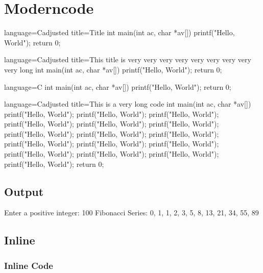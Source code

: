 \documentclass[10pt]{article}
\begin{document}
\section{Moderncode}

\begin{moderncode}{language=C}{adjusted title={Title}}
int main(int ac, char *av[])
{
	printf("Hello, World");
	return 0;
}
\end{moderncode}

\begin{moderncode}{language=C}{adjusted title={This title is very very very very very very very very very long}}
int main(int ac, char *av[])
{
	printf("Hello, World");
	return 0;
}
\end{moderncode}

\begin{moderncode}{language=C}{}
int main(int ac, char *av[])
{
	printf("Hello, World");
	return 0;
}
\end{moderncode}

\begin{moderncode}{language=C}{adjusted title={This is a very long code}}
int main(int ac, char *av[])
{
	printf("Hello, World");
	printf("Hello, World");
	printf("Hello, World");
	printf("Hello, World");
	printf("Hello, World");
	printf("Hello, World");
	printf("Hello, World");
	printf("Hello, World");
	printf("Hello, World");
	printf("Hello, World");
	printf("Hello, World");
	printf("Hello, World");
	printf("Hello, World");
	printf("Hello, World");
	printf("Hello, World");
	printf("Hello, World");
	return 0;
}
\end{moderncode}

\subsection{Output}

\begin{moderncodeout}{}{}
Enter a positive integer: 100
Fibonacci Series: 0, 1, 1, 2, 3, 5, 8, 13, 21, 34, 55, 89
\end{moderncodeout}

\subsection{Inline}

\subsubsection{Inline Code}
\end{document}
